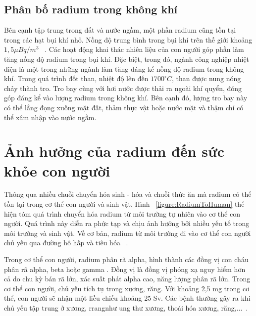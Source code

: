 \subsection{Phân bố radium trong không khí }

Bên cạnh tập trung trong đất và nước ngầm, một phần radium cũng tồn tại trong các hạt bụi khí nhỏ. Nồng độ  trung bình trong bụi khí trên thế giới khoảng $1,5\mu Bq/m^3$ ~\cite{IAEANo476:revise}. Các hoạt động khai thác nhiên liệu của con người góp phần làm tăng nồng độ radium trong bụi khí. Đặc biệt, trong đó, ngành công nghiệp nhiệt điện là một trong những ngành làm tăng đáng kể nồng độ radium trong không khí. Trong quá trình đốt than, nhiệt độ lên đến $1700 ^\circ C$, than được nung nóng chảy thành tro. Tro bay cùng với hơi nước được thải ra ngoài khí quyển, đóng góp đáng kể vào lượng radium trong không khí. Bên cạnh đó, lượng tro bay này có thể lắng đọng xuống mặt đất, thảm thực vật hoặc nước mặt và thậm chí có thể xâm nhập vào nước ngầm.
            
\section{Ảnh hưởng của radium đến sức khỏe con người}

Thông qua nhiều chuỗi chuyển hóa sinh - hóa và chuỗi thức ăn mà radium có thể tồn tại trong cơ thể con người và sinh vật. Hình ~\ref{figure:RadiumToHuman} thể hiện tóm quá trình chuyển hóa radium từ môi trường tự nhiên vào cơ thể con người. Quá trình này diễn ra phức tạp và chịu ảnh hưởng bởi nhiều yếu tố trong môi trường và sinh vật. Về cơ bản, radium từ môi trường đi vào cơ thể con người chủ yếu qua đường hô hấp và tiêu hóa ~\cite{IAEANo476:revise}.

Trong cơ thể con người, radium phân rã alpha, hình thành các đồng vị con cháu phân rã alpha, beta hoặc gamma \cite{IAEANo310:revise}. Đồng vị  là đồng vị phóng xạ nguy hiểm hơn cả do chu kỳ bán rã lớn, xác suất phát alpha cao, năng lượng phân rã lớn. Trong cơ thể con người,  chủ yếu tích tụ trong xương, răng. Với khoảng 2,5 mg  trong cơ thể, con người sẽ nhận một liều chiếu khoảng 25 Sv. Các bệnh thường gây ra khi chủ yếu tập trung ở xương, rrangnhư ung thư xương, thoái hóa xương, răng,...~\cite{Thesis:HNPThu}.


